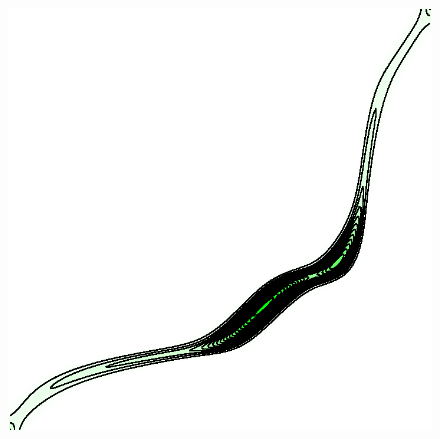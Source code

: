 \documentclass[cn,10pt,math=newtx,citestyle=gb7714-2015,bibstyle=gb7714-2015]{elegantbook}
\begin{document}
\begin{figure}[H]
\begin{minipage}{0.8\linewidth}
\begin{minipage}{0.19\linewidth}
\begin{mdframed}
		\end{mdframed}
	\end{minipage}
	\begin{minipage}{0.19\linewidth}
		\centering
		\begin{mdframed}
		    \includegraphics[width=\linewidth]{figure/fig4.4/evol-levelsets-50.eps}
		\end{mdframed}
	\end{minipage}
	\vspace{1em}
	

\end{minipage}
\end{figure}
\end{document}
